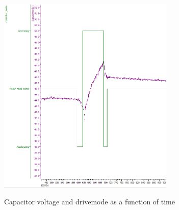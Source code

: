 \begin{figure}[H]
    \centering\label{fig:elba_capvoltage_regen}
    \includegraphics[width=0.75\textwidth]{./img/elba_capvoltage_regen}
    \caption{Capacitor voltage and drivemode as a function of time}
\end{figure}

